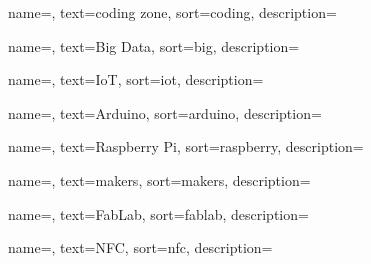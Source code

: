 {
	name=,
    text=coding zone,
    sort=coding,
    description={}
}

{
	name=,
    text=Big Data,
    sort=big,
    description={}
}

{
	name=,
    text=IoT,
    sort=iot,
    description={}
}

{
	name=,
    text=Arduino,
    sort=arduino,
    description={}
}

{
	name=,
    text=Raspberry Pi,
    sort=raspberry,
    description={}
}

{
	name=,
    text=makers,
    sort=makers,
    description={}
}

{
	name=,
    text=FabLab,
    sort=fablab,
    description={}
}

{
	name=,
    text=NFC,
    sort=nfc,
    description={}
}


